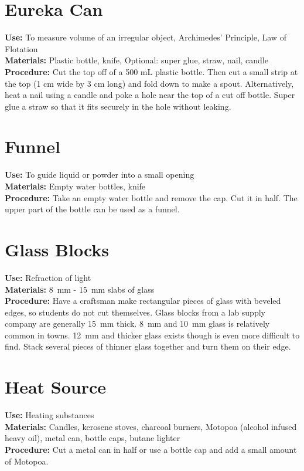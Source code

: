 \section*{Eureka Can}
\label{sec:eureka-can}
\vspace{-10pt}
\textbf{Use:} To measure volume of an irregular object, Archimedes' Principle, Law of Flotation\\
\textbf{Materials:} Plastic bottle, knife, Optional: super glue, straw, nail, candle\\
\textbf{Procedure:} Cut the top off of a 500 mL plastic bottle. Then cut a small strip at the top (1 cm wide by 3 cm long) and fold down to make a spout. Alternatively, heat a nail using a candle and poke a hole near the top of a cut off bottle. Super glue a straw so that it fits securely in the hole without leaking.

\section*{Funnel}
\vspace{-10pt}
\textbf{Use:} To guide liquid or powder into a small opening\\
\textbf{Materials:} Empty water bottles, knife\\
\textbf{Procedure:} Take an empty water bottle and remove the cap. Cut it in half. The upper part of the bottle can be used as a funnel.  

\section*{Glass Blocks}
\vspace{-10pt}
\textbf{Use:} Refraction of light\\
\textbf{Materials:} 8~mm - 15~mm slabs of glass\\
\textbf{Procedure:} Have a craftsman make rectangular pieces of glass with beveled edges, so students do not cut themselves. Glass blocks from a lab supply company are generally 15~mm thick. 8~mm and 10~mm glass is relatively common in towns. 12~mm and thicker glass exists though is even more difficult to find. 
Stack several pieces of thinner glass together and turn them on their edge.

\section*{Heat Source}
\label{sec:heatsources}
\vspace{-10pt}
\textbf{Use:} Heating substances\\
\textbf{Materials:} Candles, kerosene stoves, charcoal burners, Motopoa (alcohol infused heavy oil), metal can, bottle caps, butane lighter \\
\textbf{Procedure:} Cut a metal can in half or use a bottle cap and add a small amount of Motopoa.

